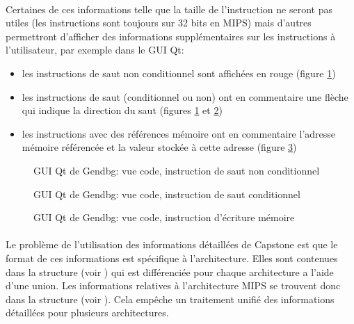 \documentclass[11pt, book, english, french, standardlists]{upmethodology-document}
\begin{document}
				\paragraph*{}
					Certaines de ces informations telle que la taille de l'instruction ne seront pas utiles (les instructions sont toujours sur 32 bits en MIPS) mais d'autres permettront d'afficher des informations supplémentaires sur les instructions à l'utilisateur, par exemple dans le \gls{GUI} Qt:
					\begin{itemize}
						\item les instructions de saut non conditionnel sont affichées en rouge (figure \ref{fig:GenDbg_GUI_Qt_Vue_code_Instruction_saut_non_conditionnel})
						\item les instructions de saut (conditionnel ou non) ont en commentaire une flèche qui indique la direction du saut (figures \ref{fig:GenDbg_GUI_Qt_Vue_code_Instruction_saut_non_conditionnel} et \ref{fig:GenDbg_GUI_Qt_Vue_code_Instruction_saut_conditionnel})
						\item les instructions avec des références mémoire ont en commentaire l'adresse mémoire référencée et la valeur stockée à cette adresse (figure \ref{fig:GenDbg_GUI_Qt_Vue_code_Instruction_ecriture_memoire})
					\end{itemize}
				\begin{figure}[H]
					\centering%
					\caption{GUI Qt de Gendbg: vue code, instruction de saut non conditionnel}%
					\label{fig:GenDbg_GUI_Qt_Vue_code_Instruction_saut_non_conditionnel}%
				\end{figure}
				\begin{figure}[H]
					\centering%
					\caption{GUI Qt de Gendbg: vue code, instruction de saut conditionnel}%
					\label{fig:GenDbg_GUI_Qt_Vue_code_Instruction_saut_conditionnel}%
				\end{figure}
				\begin{figure}[H]
					\centering%
					\caption{GUI Qt de Gendbg: vue code, instruction d'écriture mémoire}%
					\label{fig:GenDbg_GUI_Qt_Vue_code_Instruction_ecriture_memoire}%
				\end{figure}
				\paragraph*{}
					Le problème de l'utilisation des informations détaillées de Capstone est que le format de ces informations est spécifique à l'architecture. Elles sont contenues dans la structure  (voir ) qui est différenciée pour chaque architecture a l'aide d'une union. Les informations relatives à l'architecture MIPS se trouvent donc dans la structure  (voir ). Cela empêche un traitement unifié des informations détaillées pour plusieurs architectures.
\end{document}
